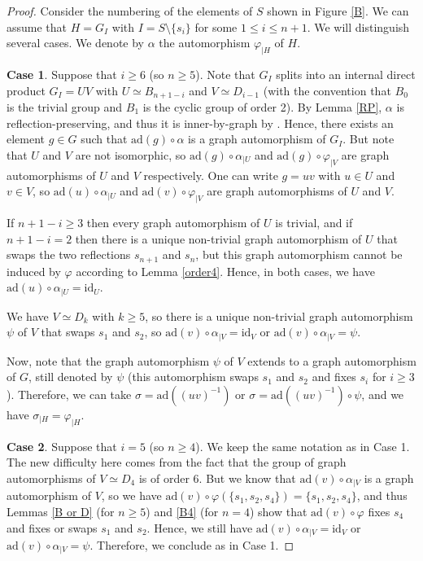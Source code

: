 \documentclass[a4paper, 11pt]{amsart}
\theoremstyle{definition}
\theoremstyle{remark}
\renewcommand{\leq}{\leqslant}
\renewcommand{\geq}{\geqslant}
\begin{document}
\begin{proof}
Consider the numbering of the elements of $S$ shown in Figure \ref{B}. We can assume that $H=G_I$ with $I= S\setminus \lbrace s_i\rbrace$ for some $1\leq i\leq n+1$. We will distinguish several cases. We denote by $\alpha$ the automorphism $\varphi_{\vert H}$ of $H$. 

\smallskip

\noindent \textbf{Case 1}. Suppose that $i\geq 6$ (so $n\geq 5$). Note that $G_I$ splits into an internal direct product $G_I=UV$ with $U\simeq B_{n+1-i}$ and $V\simeq D_{i-1}$ (with the convention that $B_0$ is the trivial group and $B_1$ is the cyclic group of order 2). By Lemma \ref{RP}, $\alpha$ is reflection-preserving, and thus it is inner-by-graph by \cite[Proposition 1.44]{franz}. Hence, there exists an element $g\in G$ such that $\mathrm{ad}(g)\circ \alpha$ is a graph automorphism of $G_I$. But note that $U$ and $V$ are not isomorphic, so $\mathrm{ad}(g)\circ \alpha_{\vert U}$ and $\mathrm{ad}(g)\circ \varphi_{\vert V}$ are graph automorphisms of $U$ and $V$ respectively. One can write $g=uv$ with $u\in U$ and $v\in V$, so $\mathrm{ad}(u)\circ \alpha_{\vert U}$ and $\mathrm{ad}(v)\circ \varphi_{\vert V}$ are graph automorphisms of $U$ and $V$.

\noindent If $n+1-i\geq 3$ then every graph automorphism of $U$ is trivial, and if $n+1-i=2$ then there is a unique non-trivial graph automorphism of $U$ that swaps the two reflections $s_{n+1}$ and $s_n$, but this graph automorphism cannot be induced by $\varphi$ according to Lemma \ref{order4}. Hence, in both cases, we have $\mathrm{ad}(u)\circ \alpha_{\vert U}=\mathrm{id}_U$. 

\noindent We have $V\simeq D_k$ with $k\geq 5$, so there is a unique non-trivial graph automorphism $\psi$ of $V$ that swaps $s_1$ and $s_2$, so $\mathrm{ad}(v)\circ \alpha_{\vert V}=\mathrm{id}_V$ or $\mathrm{ad}(v)\circ \alpha_{\vert V}=\psi$.

\noindent Now, note that the graph automorphism $\psi$ of $V$ extends to a graph automorphism of $G$, still denoted by $\psi$ (this automorphism swaps $s_1$ and $s_2$ and fixes $s_i$ for $i\geq 3$). Therefore, we can take $\sigma=\mathrm{ad}((uv)^{-1})$ or $\sigma=\mathrm{ad}((uv)^{-1})\circ \psi$, and we have $\sigma_{\vert H}=\varphi_{\vert H}$.

\smallskip
\noindent \textbf{Case 2}. Suppose that $i=5$ (so $n\geq 4$). We keep the same notation as in Case 1. The new difficulty here comes from the fact that the group of graph automorphisms of $V\simeq D_4$ is of order 6. But we know that $\mathrm{ad}(v)\circ \alpha_{\vert V}$ is a graph automorphism of $V$, so we have $\mathrm{ad}(v)\circ \varphi(\lbrace s_1,s_2,s_4\rbrace)=\lbrace s_1,s_2,s_4\rbrace$, and thus Lemmas \ref{B or D} (for $n\geq 5$) and \ref{B4} (for $n=4$) show that $\mathrm{ad}(v)\circ \varphi$ fixes $s_4$ and fixes or swaps $s_1$ and $s_2$. Hence, we still have $\mathrm{ad}(v)\circ \alpha_{\vert V}=\mathrm{id}_V$ or $\mathrm{ad}(v)\circ \alpha_{\vert V}=\psi$. Therefore, we conclude as in Case 1.


\end{proof}
\end{document}
